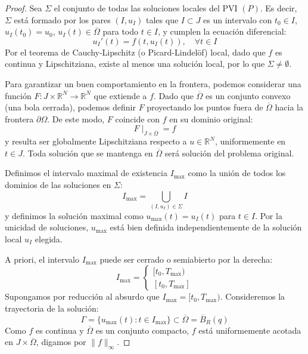 \begin{proof}
    Sea $\Sigma$ el conjunto de todas las soluciones locales del PVI $(P)$. Es decir, $\Sigma$ está formado por los pares $(I, u_I)$ tales que $I \subset J$ es un intervalo con $t_0 \in I$, $u_I(t_0) = u_0$, $u_I(t) \in \overline{\Omega}$ para todo $t \in I$, y cumplen la ecuación diferencial:
    \[
        u_I'(t) = f(t, u_I(t)), \quad \forall t \in I
    \]
    Por el teorema de Cauchy-Lipschitz (o Picard-Lindelöf) local, dado que $f$ es continua y Lipschitziana, existe al menos una solución local, por lo que $\Sigma \neq \emptyset$.

    Para garantizar un buen comportamiento en la frontera, podemos considerar una función $F : J \times \mathbb{R}^N \to \mathbb{R}^N$ que extiende a $f$. Dado que $\overline{\Omega}$ es un conjunto convexo (una bola cerrada), podemos definir $F$ proyectando los puntos fuera de $\overline{\Omega}$ hacia la frontera $\partial \Omega$. De este modo, $F$ coincide con $f$ en su dominio original:
    \[
        F \mid_{J \times \overline{\Omega}} = f
    \]
    y resulta ser globalmente Lipschitziana respecto a $u \in \mathbb{R}^N$, uniformemente en $t \in J$. Toda solución que se mantenga en $\overline{\Omega}$ será solución del problema original.

    Definimos el intervalo maximal de existencia $I_{\text{max}}$ como la unión de todos los dominios de las soluciones en $\Sigma$:
    \[
        I_{\text{max}} = \bigcup_{(I, u_I) \in \Sigma} I
    \]
    y definimos la solución maximal como $u_{\text{max}}(t) = u_I(t)$ para $t \in I$. Por la unicidad de soluciones, $u_{\text{max}}$ está bien definida independientemente de la solución local $u_I$ elegida. 
    
    A priori, el intervalo $I_{\text{max}}$ puede ser cerrado o semiabierto por la derecha:
    \[
        I_{\text{max}} = 
        \begin{cases}
            [t_0, T_{\text{max}}) \\
            [t_0, T_{\text{max}}]
        \end{cases}
    \]
    Supongamos por reducción al absurdo que $I_{\text{max}} = [t_0, T_{\text{max}})$. Consideremos la trayectoria de la solución:
    \[
        \Gamma = \{ u_{\text{max}}(t) : t \in I_{\text{max}} \} \subset \overline{\Omega} = \overline{B}_R(q)
    \]
    Como $f$ es continua y $\overline{\Omega}$ es un conjunto compacto, $f$ está uniformemente acotada en $J \times \overline{\Omega}$, digamos por $\| f \|_\infty$. 
    

\end{proof}
